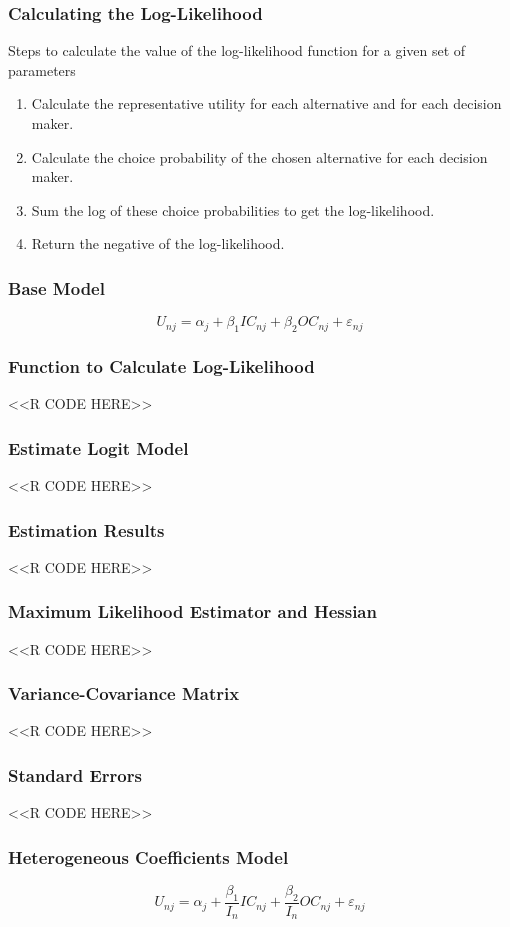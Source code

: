 \documentclass{beamer}
\begin{document}
\begin{frame}\frametitle{Calculating the Log-Likelihood}
    Steps to calculate the value of the log-likelihood function for a given set of parameters
    \begin{enumerate}
        \item Calculate the representative utility for each alternative and for each decision maker.
        \item Calculate the choice probability of the chosen alternative for each decision maker.
        \item Sum the log of these choice probabilities to get the log-likelihood.
        \item Return the negative of the log-likelihood.
    \end{enumerate}
\end{frame}

\begin{frame}\frametitle{Base Model}
    $$U_{nj} = \alpha_j + \beta_1 IC_{nj} + \beta_2 OC_{nj} + \varepsilon_{nj}$$
\end{frame}

\begin{frame}[fragile]\frametitle{Function to Calculate Log-Likelihood}
    \vspace{1ex}
    <<R CODE HERE>>
\end{frame}

\begin{frame}[fragile]\frametitle{Estimate Logit Model}
    <<R CODE HERE>>
\end{frame}

\begin{frame}[fragile]\frametitle{Estimation Results}
    <<R CODE HERE>>
\end{frame}

\begin{frame}[fragile]\frametitle{Maximum Likelihood Estimator and Hessian}
    <<R CODE HERE>>
\end{frame}

\begin{frame}[fragile]\frametitle{Variance-Covariance Matrix}
    <<R CODE HERE>>
\end{frame}

\begin{frame}[fragile]\frametitle{Standard Errors}
    <<R CODE HERE>>
\end{frame}

\begin{frame}\frametitle{Heterogeneous Coefficients Model}
    $$U_{nj} = \alpha_j + \frac{\beta_1}{I_n} IC_{nj} + \frac{\beta_2}{I_n} OC_{nj} + \varepsilon_{nj}$$
\end{frame}
\end{document}

